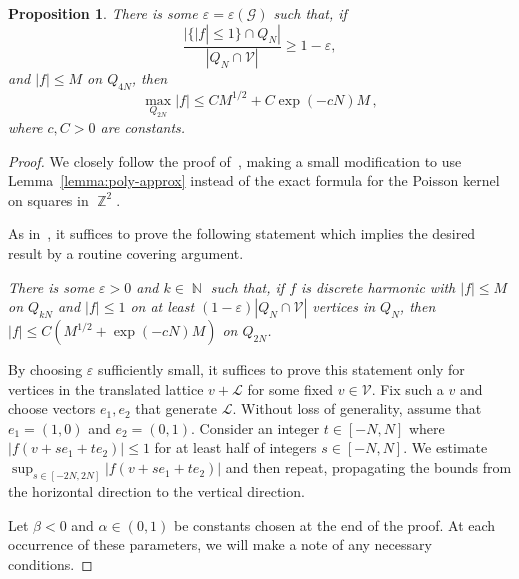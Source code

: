\documentclass{daj}
\newtheorem{prop}[theorem]{Proposition}
\newcommand{\G}{\mathcal{G}}
\newcommand{\V}{\mathcal{V}}
\newcommand{\eps}{\varepsilon}
\DeclareMathOperator{\Z}{\mathbb{Z}}
\DeclareMathOperator{\N}{\mathbb{N}}
\begin{document}
\begin{prop}
	\label{prop:three-ball}
	There is some $\eps = \eps(\G)$ such that, if
	\begin{equation*}
		\frac{|\{|f| \leq 1\} \cap Q_N|}{|Q_N \cap \V|} \geq 1-\eps,
	\end{equation*}
	and $|f| \leq M$ on $Q_{4N}$, then
	\begin{equation}
		\label{eq:three-ball-statement}
		\max_{Q_{2N}} |f| \leq CM^{1/2} + C\exp(-cN)M \, ,
	\end{equation}
	where $c, C > 0$ are constants.
\end{prop}
\begin{proof}
	We closely follow the proof of~\cite[Theorem~3.1]{buhovsky2022discrete}, making a small modification to use Lemma~\ref{lemma:poly-approx} instead of the exact formula for the Poisson kernel on squares in $\Z^2$.
	
	As in~\cite{buhovsky2022discrete}, it suffices to prove the following statement which implies the desired result by a routine covering argument.
	
	\emph{There is some $\varepsilon > 0$ and $k \in \N$ such that, if $f$ is discrete harmonic with $|f| \leq M$ on $Q_{kN}$ and $|f| \leq 1$ on at least $(1-\eps)|Q_N \cap \V|$  vertices in $Q_{N}$, then $|f| \leq C(M^{1/2} + \exp(-cN)M)$ on $Q_{2N}$.}
	
	By choosing $\eps$ sufficiently small, it suffices to prove this statement only for vertices in the translated lattice $v + \mathcal{L}$ for some fixed $v \in \V$. Fix such a $v$ and choose vectors $e_1, e_2$ that generate $\mathcal{L}$. Without loss of generality, assume that $e_1 = (1, 0)$ and $e_2 = (0, 1)$. Consider an integer $t \in [-N, N]$ where $|f(v + se_1 + te_2)| \leq 1$ for at least half of integers $s \in [-N, N]$. We estimate $\sup_{s \in [-2N, 2N]} |f(v + se_1 + te_2)|$ and then repeat, propagating the bounds from the horizontal direction to the vertical direction.
	
	Let $\beta < 0$ and $\alpha \in (0, 1)$ be constants chosen at the end of the proof. At each occurrence of these parameters, we will make a note of any necessary conditions.
	

\end{proof}
\end{document}
